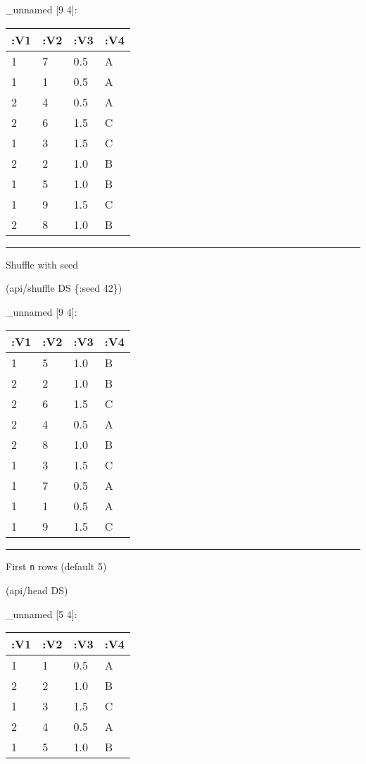 \documentclass[]{article}
\newenvironment{Shaded}{\begin{snugshade}}{\end{snugshade}}
\newcommand{\AttributeTok}[1]{\textcolor[rgb]{0.77,0.63,0.00}{#1}}
\newcommand{\DecValTok}[1]{\textcolor[rgb]{0.00,0.00,0.81}{#1}}
\newcommand{\NormalTok}[1]{#1}
\begin{document}
\_unnamed {[}9 4{]}:

\begin{longtable}[]{@{}llll@{}}
\toprule
:V1 & :V2 & :V3 & :V4\tabularnewline
\midrule
\endhead
1 & 7 & 0.5 & A\tabularnewline
1 & 1 & 0.5 & A\tabularnewline
2 & 4 & 0.5 & A\tabularnewline
2 & 6 & 1.5 & C\tabularnewline
1 & 3 & 1.5 & C\tabularnewline
2 & 2 & 1.0 & B\tabularnewline
1 & 5 & 1.0 & B\tabularnewline
1 & 9 & 1.5 & C\tabularnewline
2 & 8 & 1.0 & B\tabularnewline
\bottomrule
\end{longtable}

\begin{center}\rule{0.5\linewidth}{0.5pt}\end{center}

Shuffle with seed

\begin{Shaded}
\begin{Highlighting}[]
\NormalTok{(api/shuffle DS \{}\AttributeTok{:seed} \DecValTok{42}\NormalTok{\})}
\end{Highlighting}
\end{Shaded}

\_unnamed {[}9 4{]}:

\begin{longtable}[]{@{}llll@{}}
\toprule
:V1 & :V2 & :V3 & :V4\tabularnewline
\midrule
\endhead
1 & 5 & 1.0 & B\tabularnewline
2 & 2 & 1.0 & B\tabularnewline
2 & 6 & 1.5 & C\tabularnewline
2 & 4 & 0.5 & A\tabularnewline
2 & 8 & 1.0 & B\tabularnewline
1 & 3 & 1.5 & C\tabularnewline
1 & 7 & 0.5 & A\tabularnewline
1 & 1 & 0.5 & A\tabularnewline
1 & 9 & 1.5 & C\tabularnewline
\bottomrule
\end{longtable}

\begin{center}\rule{0.5\linewidth}{0.5pt}\end{center}

First \texttt{n} rows (default 5)

\begin{Shaded}
\begin{Highlighting}[]
\NormalTok{(api/head DS)}
\end{Highlighting}
\end{Shaded}

\_unnamed {[}5 4{]}:

\begin{longtable}[]{@{}llll@{}}
\toprule
:V1 & :V2 & :V3 & :V4\tabularnewline
\midrule
\endhead
1 & 1 & 0.5 & A\tabularnewline
2 & 2 & 1.0 & B\tabularnewline
1 & 3 & 1.5 & C\tabularnewline
2 & 4 & 0.5 & A\tabularnewline
1 & 5 & 1.0 & B\tabularnewline
\bottomrule
\end{longtable}
\end{document}
